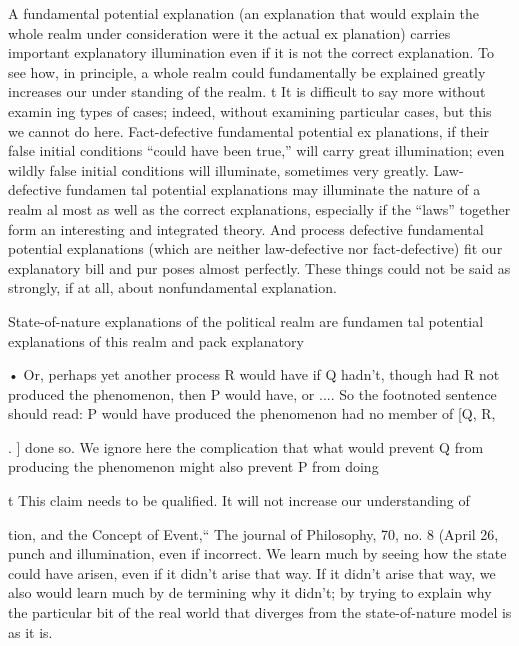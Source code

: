 \documentclass[11pt,openany]{book}
\begin{document}
A fundamental potential explanation (an explanation that would explain the whole realm under consideration were it the actual ex planation) carries important explanatory illumination even if it is not the correct explanation. To see how, in principle, a whole realm could fundamentally be explained greatly increases our under standing of the realm. t It is difficult to say more without examin ing types of cases; indeed, without examining particular cases, but this we cannot do here. Fact-defective fundamental potential ex planations, if their false initial conditions ``could have been true,'' will carry great illumination; even wildly false initial conditions will illuminate, sometimes very greatly. Law-defective fundamen tal potential explanations may illuminate the nature of a realm al most as well as the correct explanations, especially if the ``laws'' together form an interesting and integrated theory. And process defective fundamental potential explanations (which are neither law-defective nor fact-defective) fit our explanatory bill and pur poses almost perfectly. These things could not be said as strongly, if at all, about nonfundamental explanation. 

State-of-nature explanations of the political realm are fundamen tal potential explanations of this realm and pack explanatory 

• Or, perhaps yet another process R would have if Q hadn't, though had R not produced the phenomenon, then P would have, or .... So the footnoted sentence should read: P would have produced the phenomenon had no member of [Q, R, 

. ] done so. We ignore here the complication that what would prevent Q from producing the phenomenon might also prevent P from doing 

t This claim needs to be qualified. It will not increase our understanding of 

tion, and the Concept of Event,`` The journal of Philosophy, 70, no. 8 (April 26, punch and illumination, even if incorrect. We learn much by seeing how the state could have arisen, even if it didn't arise that way. If it didn't arise that way, we also would learn much by de termining why it didn't; by trying to explain why the particular bit of the real world that diverges from the state-of-nature model is as it is. 
\end{document}
